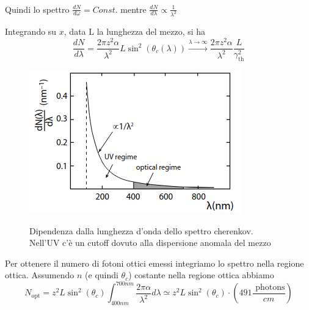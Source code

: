\begin{remark}\hfill \\
    Quindi lo spettro $\frac{dN}{d\omega}=Const.$ mentre $\frac{dN}{d\lambda}\propto\frac{1}{\lambda^2}$
\end{remark}
Integrando su $x$, data L la lunghezza del mezzo, si ha
\[\frac{dN}{d\lambda}=\frac{2\pi z^2 \alpha}{\lambda^2}L\sin^2(\theta_c(\lambda)) \xrightarrow{\lambda \to \infty}\frac{2\pi z^2 \alpha}{\lambda^2}\frac{L}{\gamma_\text{th}^2}
\]
\hspace{-5pt}
\begin{minipage}{0.65\textwidth}
    \begin{figure}[H]
        \centering
        \includegraphics[width=\textwidth,frame]{Chapters/images/Particle_identification/image-20220317171549887.png}

    \end{figure}
\end{minipage} \hspace{5pt}
\begin{minipage}{0.35\textwidth}
\begin{figure}[H]
    \centering
    \captionsetup{width=\textwidth}
    \caption{Dipendenza dalla lunghezza d'onda dello spettro cherenkov. \\ Nell'UV c'è un cutoff dovuto alla dispersione anomala del mezzo}
\end{figure}
    

\end{minipage}

Per ottenere il numero di fotoni ottici emessi integriamo lo spettro nella regione ottica.
Assumendo $n$ (e quindi $\theta_c$) costante nella regione ottica abbiamo
\[N_\text{opt}=z^2L\sin^2(\theta_c)\int_{400nm}^{700nm}\frac{2\pi \alpha}{\lambda^2}d\lambda\simeq z^2L\sin^2(\theta_c) \cdot \left(491 \frac{\text{ photons}}{cm}\right)\]

